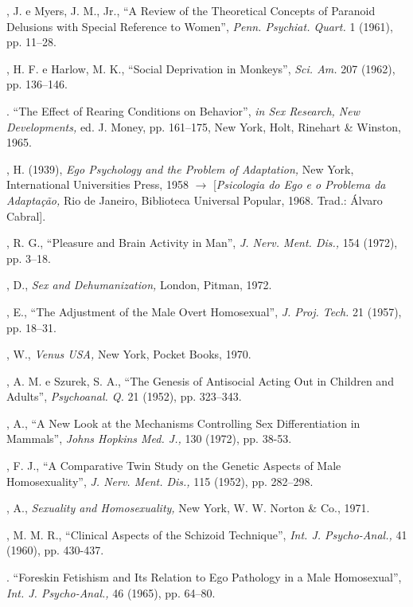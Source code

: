 \begin{description}
, J. e Myers, J. M., Jr., ``A Review of the Theoretical
Concepts of Paranoid Delusions with Special Reference to Women'',
\textit{ Penn. Psychiat. Quart. } 1 (1961), pp. 11--28.

, H. F. e Harlow, M. K., ``Social Deprivation in
Monkeys'', \textit{Sci. Am. } 207 (1962), pp. 136--146.

. ``The Effect of Rearing Conditions on
Behavior'', \textit{in Sex Research, New Developments, }ed. J. Money,
pp. 161--175, New York, Holt, Rinehart \& Winston, 1965.

, H. (1939), \textit{Ego Psychology and the Problem of Adaptation, }New
York, International Universities Press, 1958 {$\bm{\rightarrow}$} [\textit{Psicologia do Ego e o
Problema da Adaptação, }Rio de Janeiro, Biblioteca Universal Popular, 1968. Trad.:
Álvaro Cabral].

, R. G., ``Pleasure and Brain Activity in Man'',
\textit{J. Nerv. Ment. Dis., } 154 (1972), pp. 3--18.

, D., \textit{Sex and Dehumanization, }London, Pitman, 1972.

, E., ``The Adjustment of the Male Overt
Homosexual'', \textit{ J. Proj. Tech. }21 (1957), pp. 18--31.

, W., \textit{Venus USA, }New York, Pocket Books, 1970.

, A. M. e Szurek, S. A., ``The Genesis of Antisocial Acting
Out in Children and Adults'', \textit{Psychoanal. Q. }21 (1952), pp.
323--343.

, A., ``A New Look at the Mechanisms Controlling Sex
Differentiation in Mammals'', \textit{Johns Hopkins Med. J., }130
(1972), pp. 38-53.

, F. J., ``A Comparative Twin Study on the Genetic Aspects
of Male Homosexuality'', \textit{J. Nerv. Ment. Dis., }115 (1952),
pp. 282--298.

, A., \textit{Sexuality and Homosexuality, }New York, W. W. Norton \&
Co., 1971.

, M. M. R., ``Clinical Aspects of the Schizoid
Technique'', \textit{Int. J. Psycho-Anal., } 41 (1960), pp. 430-437.

. ``Foreskin Fetishism and Its Relation to Ego
Pathology in a Male Homosexual'', \textit{Int. J. Psycho-Anal., } 46
(1965), pp. 64--80.


\end{description}
